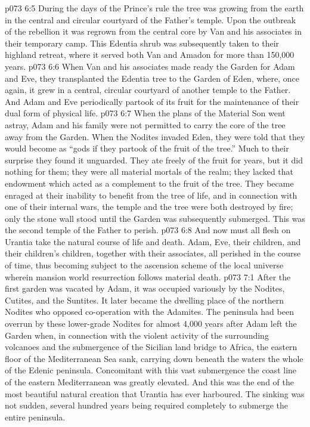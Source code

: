\vs p073 6:5 \pc During the days of the Prince’s rule the tree was growing from the earth in the central and circular courtyard of the Father’s temple. Upon the outbreak of the rebellion it was regrown from the central core by Van and his associates in their temporary camp. This Edentia shrub was subsequently taken to their highland retreat, where it served both Van and Amadon for more than 150,000 years.
\vs p073 6:6 When Van and his associates made ready the Garden for Adam and Eve, they transplanted the Edentia tree to the Garden of Eden, where, once again, it grew in a central, circular courtyard of another temple to the Father. And Adam and Eve periodically partook of its fruit for the maintenance of their dual form of physical life.
\vs p073 6:7 \pc When the plans of the Material Son went astray, Adam and his family were not permitted to carry the core of the tree away from the Garden. When the Nodites invaded Eden, they were told that they would become as “gods if they partook of the fruit of the tree.” Much to their surprise they found it unguarded. They ate freely of the fruit for years, but it did nothing for them; they were all material mortals of the realm; they lacked that endowment which acted as a complement to the fruit of the tree. They became enraged at their inability to benefit from the tree of life, and in connection with one of their internal wars, the temple and the tree were both destroyed by fire; only the stone wall stood until the Garden was subsequently submerged. This was the second temple of the Father to perish.
\vs p073 6:8 And now must all flesh on Urantia take the natural course of life and death. Adam, Eve, their children, and their children’s children, together with their associates, all perished in the course of time, thus becoming subject to the ascension scheme of the local universe wherein mansion world resurrection follows material death.
\vs p073 7:1 After the first garden was vacated by Adam, it was occupied variously by the Nodites, Cutites, and the Suntites. It later became the dwelling place of the northern Nodites who opposed co\hyp{}operation with the Adamites. The peninsula had been overrun by these lower\hyp{}grade Nodites for almost 4,000 years after Adam left the Garden when, in connection with the violent activity of the surrounding volcanoes and the submergence of the Sicilian land bridge to Africa, the eastern floor of the Mediterranean Sea sank, carrying down beneath the waters the whole of the Edenic peninsula. Concomitant with this vast submergence the coast line of the eastern Mediterranean was greatly elevated. And this was the end of the most beautiful natural creation that Urantia has ever harboured. The sinking was not sudden, several hundred years being required completely to submerge the entire peninsula.
